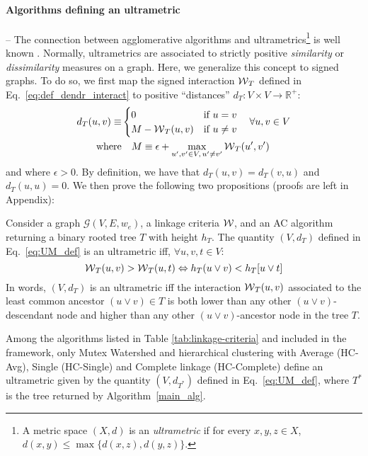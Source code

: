 \paragraph{Algorithms defining an ultrametric} -- The connection between agglomerative algorithms and ultrametrics\footnote{A metric space $(X,d)$ is an \emph{ultrametric} if for every $x,y,z \in X$, $d(x,y)\leq \max \{d(x,z), d(y,z)\}$.} is well known \cite{johnson1967hierarchical,milligan1979ultrametric}. Normally, ultrametrics are associated to strictly positive \emph{similarity} or \emph{dissimilarity} measures on a graph. Here, we generalize this concept to signed graphs. To do so, we first map the signed interaction $\mathcal{W}{}_{T}{}$ defined in Eq.~\ref{eq:def_dendr_interact} to positive ``distances'' $d_{T}:V \times V \rightarrow \mathbb{R}^{+}$:
\begin{align}\label{eq:UM_def}
d_{T}(u,v)\equiv &\begin{cases}
0 & \text{if}\,\, u=v\\
M-\mathcal{W}{}_{T}(u,v) & \text{if}\,\, u\neq v
\end{cases}\quad \forall u,v\in V\\
\mathrm{where}& \quad  M \equiv  \epsilon + \max_{u',v'\in V,\,u'\neq v'}\mathcal{W}{}_{T}(u',v')
\end{align}
and where $\epsilon > 0$. By definition, we have that $d_{T}(u,v)=d_{T}(v,u)$ and $d_{T}(u,u)= 0$. We then prove the following two propositions (proofs are left in Appendix):
\begin{prop}
Consider a graph $\mathcal{G}(V,E,w_e)$, a linkage criteria $\mathcal{W}{}$, and an AC algorithm returning a binary rooted tree $T$ with height $h_T$. The quantity $(V, d_{T})$ defined in Eq.~\ref{eq:UM_def} is an ultrametric iff, $\forall u,v,t \in V$:
\begin{equation}
\mathcal{W}{}_{T}(u,v) > \mathcal{W}{}_{T}(u,t) \Leftrightarrow h_T(u \vee v) < h_T[u \vee t] 
\end{equation}
In words, $(V, d_{T})$ is an ultrametric iff the interaction $\mathcal{W}{}_{T}(u, v)$ associated to the least common ancestor ${(u\vee v)\in T}$ is both lower than any other $(u\vee v)$-descendant node and higher than any other $(u\vee v)$-ancestor node in the tree $T$.
\end{prop}
\begin{prop}
Among the algorithms listed in Table \ref{tab:linkage-criteria} and included in the \algname{} framework, only Mutex Watershed and hierarchical clustering with Average (HC-Avg), Single (HC-Single) and Complete linkage (HC-Complete) define an ultrametric given by the quantity $(V, d_{T^*})$ defined in Eq.~\ref{eq:UM_def}, where $T^*$ is the tree returned by Algorithm~\ref{main_alg}.
\end{prop}





